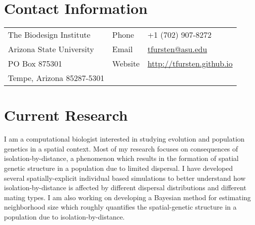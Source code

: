 \documentclass[11pt]{article}
\begin{document}
\section*{Contact Information}
\begin{tabular}[c]{p{3.5in}ll}
The Biodesign Institute& Phone & +1 (702) 907-8272\\
Arizona State University& Email & \href{mailto:tfursten@asu.edu}{tfursten@asu.edu}\\
PO Box 875301 & Website & \href{http://tfursten.github.io}{http://tfursten.github.io}\\
Tempe, Arizona 85287-5301&&\\
\end{tabular}

\section*{Current Research}
I am a computational biologist interested in studying evolution and population genetics in a spatial context. Most of my research focuses on consequences of isolation-by-distance, a phenomenon which results in the formation of spatial genetic structure in a population due to limited dispersal. I have developed several spatially-explicit individual based simulations to better understand how isolation-by-distance is affected by different dispersal distributions and different mating types. I am also working on developing a Bayesian method for estimating neighborhood size which roughly quantifies the spatial-genetic structure in a population due to isolation-by-distance.

\end{document}
